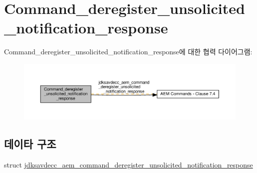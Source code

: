 \hypertarget{group__command__deregister__unsolicited__notification__response}{}\section{Command\+\_\+deregister\+\_\+unsolicited\+\_\+notification\+\_\+response}
\label{group__command__deregister__unsolicited__notification__response}
Command\+\_\+deregister\+\_\+unsolicited\+\_\+notification\+\_\+response에 대한 협력 다이어그램\+:
\nopagebreak
\begin{figure}[H]
\begin{center}
\leavevmode
\includegraphics[width=350pt]{group__command__deregister__unsolicited__notification__response}
\end{center}
\end{figure}
\subsection*{데이타 구조}
\begin{DoxyCompactItemize}
\item 
struct \hyperlink{structjdksavdecc__aem__command__deregister__unsolicited__notification__response}{jdksavdecc\+\_\+aem\+\_\+command\+\_\+deregister\+\_\+unsolicited\+\_\+notification\+\_\+response}
\end{DoxyCompactItemize}
